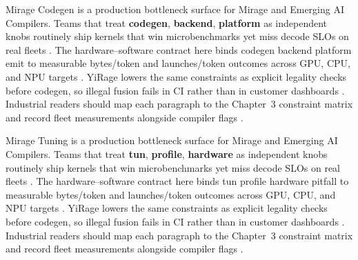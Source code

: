 Mirage Codegen is a production bottleneck surface for Mirage and Emerging AI Compilers. Teams that treat \textbf{codegen}, \textbf{backend}, \textbf{platform} as independent knobs routinely ship kernels that win microbenchmarks yet miss decode SLOs on real fleets \citep{dlbook,nvidia2024cudagraphs}. The hardware--software contract here binds codegen backend platform emit to measurable bytes/token and launches/token outcomes across GPU, CPU, and NPU targets \citep{dao2022flashattention,liu2024deepseekv3}. YiRage lowers the same constraints as explicit legality checks before codegen, so illegal fusion fails in CI rather than in customer dashboards \citep{kwon2023vllm,patel2025llminference}. Industrial readers should map each paragraph to the Chapter~3 constraint matrix and record fleet measurements alongside compiler flags \citep{nvidia2024cudagraphs,taxbreak2026}.

Mirage Tuning is a production bottleneck surface for Mirage and Emerging AI Compilers. Teams that treat \textbf{tun}, \textbf{profile}, \textbf{hardware} as independent knobs routinely ship kernels that win microbenchmarks yet miss decode SLOs on real fleets \citep{dao2022flashattention,liu2024deepseekv3}. The hardware--software contract here binds tun profile hardware pitfall to measurable bytes/token and launches/token outcomes across GPU, CPU, and NPU targets \citep{kwon2023vllm,patel2025llminference}. YiRage lowers the same constraints as explicit legality checks before codegen, so illegal fusion fails in CI rather than in customer dashboards \citep{nvidia2024cudagraphs,taxbreak2026}. Industrial readers should map each paragraph to the Chapter~3 constraint matrix and record fleet measurements alongside compiler flags \citep{liu2024deepseekv3,memoryfloor2026}.

